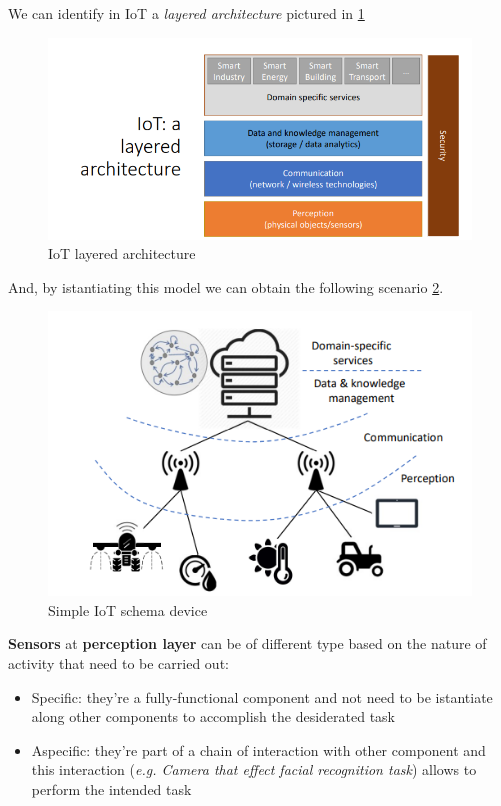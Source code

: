 \documentclass[10pt,a4paper]{report}
\theoremstyle{definition}
\begin{document}
We can identify in IoT a \textit{layered architecture} pictured in \ref{layered-arch}
\begin{figure}[h]
	\centering
	\includegraphics[scale=0.50]{images/Pasted image 20230221153200.png}
	\caption{IoT layered architecture}
	\label{layered-arch}
\end{figure}
And, by istantiating this model we can obtain the following scenario \ref{iot-scenario1}.

\begin{figure}[h]
	\centering
	\includegraphics[scale=0.50]{images/Pasted image 20230221153337.png}
	\caption{Simple IoT schema device}
	\label{iot-scenario1}
\end{figure}

\textbf{Sensors} at \textbf{perception layer} can be  of different type based on the nature of activity that need to be carried out:
\begin{itemize}
	\item 
	Specific: they're a fully-functional component and not need to be istantiate along other components to accomplish the desiderated task
	\item 
	Aspecific: they're part of a chain of interaction with other component and this interaction (\textit{e.g. Camera that effect facial recognition task}) allows to perform the intended task
\end{itemize}
\end{document}
